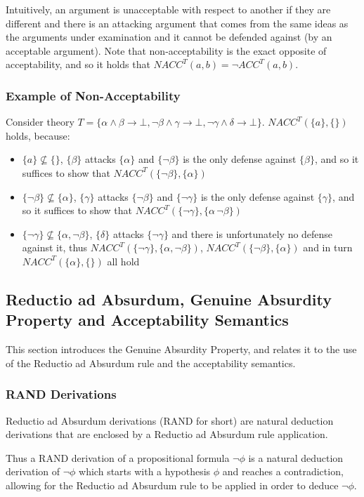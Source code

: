 \documentclass[11pt,twoside,a4paper]{report}
\begin{document}
Intuitively, an argument is unacceptable with respect to another if they are different and there is an attacking argument that comes from the same ideas as the arguments under examination and it cannot be defended against (by an acceptable argument). Note that non-acceptability is the exact opposite of acceptability, and so it holds that $NACC^T(a,b) = \neg ACC^T(a,b)$.

\subsubsection{Example of Non-Acceptability}
Consider theory $T = \{\alpha\wedge\beta\rightarrow\bot, \neg\beta\wedge\gamma\rightarrow\bot, \neg\gamma\wedge\delta\rightarrow\bot\}$. $NACC^T(\{a\},\{\})$ holds, because:
\begin{itemize}
\item
$\{a\}\nsubseteq\{\}$, $\{\beta\}$ attacks $\{\alpha\}$ and $\{\neg\beta\}$ is the only defense against $\{\beta\}$, and so it suffices to show that $NACC^T(\{\neg\beta\}, \{\alpha\})$
\item
$\{\neg\beta\}\nsubseteq\{\alpha\}$, $\{\gamma\}$ attacks $\{\neg\beta\}$ and $\{\neg\gamma\}$ is the only defense against $\{\gamma\}$, and so it suffices to show that $NACC^T(\{\neg\gamma\}, \{\alpha\, \neg\beta\})$
\item
$\{\neg\gamma\}\nsubseteq\{\alpha, \neg\beta\}$, $\{\delta\}$ attacks $\{\neg\gamma\}$ and there is unfortunately no defense against it, thus $NACC^T(\{\neg\gamma\}, \{\alpha,\neg\beta\})$, $NACC^T(\{\neg\beta\}, \{\alpha\})$ and in turn $NACC^T(\{\alpha\}, \{\})$ all hold
\end{itemize}

\subsection{Reductio ad Absurdum, Genuine Absurdity Property and Acceptability Semantics}
This section introduces the Genuine Absurdity Property, and relates it to the use of the Reductio ad Absurdum rule and the acceptability semantics.

\subsubsection{RAND Derivations}
\label{subsec:rand}
Reductio ad Absurdum derivations (RAND for short) are natural deduction derivations that are enclosed by a Reductio ad Absurdum rule application. 

Thus a RAND derivation of a propositional formula $\neg\phi$ is a natural deduction derivation of $\neg\phi$ which starts with a hypothesis $\phi$ and reaches a contradiction, allowing for the Reductio ad Absurdum rule to be applied in order to deduce $\neg\phi$.
\end{document}
